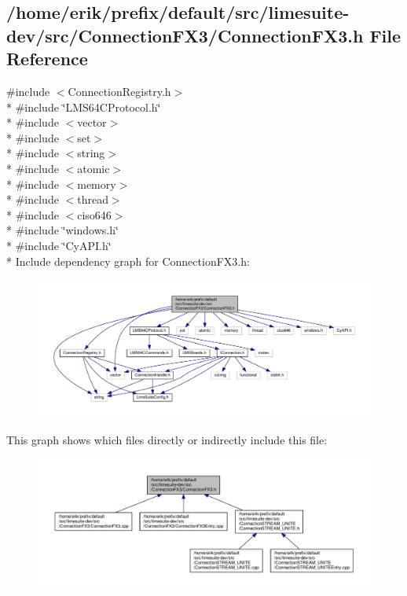 \subsection{/home/erik/prefix/default/src/limesuite-\/dev/src/\+Connection\+F\+X3/\+Connection\+F\+X3.h File Reference}
\label{ConnectionFX3_8h}
{\ttfamily \#include $<$Connection\+Registry.\+h$>$}\\*
{\ttfamily \#include \char`\"{}L\+M\+S64\+C\+Protocol.\+h\char`\"{}}\\*
{\ttfamily \#include $<$vector$>$}\\*
{\ttfamily \#include $<$set$>$}\\*
{\ttfamily \#include $<$string$>$}\\*
{\ttfamily \#include $<$atomic$>$}\\*
{\ttfamily \#include $<$memory$>$}\\*
{\ttfamily \#include $<$thread$>$}\\*
{\ttfamily \#include $<$ciso646$>$}\\*
{\ttfamily \#include \char`\"{}windows.\+h\char`\"{}}\\*
{\ttfamily \#include \char`\"{}Cy\+A\+P\+I.\+h\char`\"{}}\\*
Include dependency graph for Connection\+F\+X3.\+h\+:
\nopagebreak
\begin{figure}[H]
\begin{center}
\leavevmode
\includegraphics[width=350pt]{d6/d77/ConnectionFX3_8h__incl}
\end{center}
\end{figure}
This graph shows which files directly or indirectly include this file\+:
\nopagebreak
\begin{figure}[H]
\begin{center}
\leavevmode
\includegraphics[width=350pt]{d4/dd1/ConnectionFX3_8h__dep__incl}
\end{center}
\end{figure}

